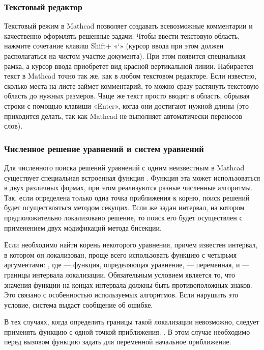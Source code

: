 \subsubsection*{Текстовый редактор}

Текстовый режим в Mathcad позволяет создавать всевозможные комментарии и качественно оформлять решенные задачи.
Чтобы ввести текстовую область, нажмите сочетание клавиш Shift+ «‘» (курсор ввода при этом должен располагаться на чистом участке документа). При этом появится специальная рамка, а курсор ввода приобретет вид красной вертикальной линии.
Набирается текст в Mathcad точно так же, как в любом текстовом редакторе. Если известно, сколько места на листе займет комментарий, то можно сразу растянуть текстовую область до нужных размеров. Чаще же текст просто вводят в область, обрывая строки с помощью клавиши «Enter», когда они достигают нужной длины (это приходится делать, так как Mathcad не выполняет автоматически переносов слов).

\subsubsection*{Численное решение уравнений и систем уравнений}
Для численного поиска решений уравнений с одним неизвестным в Mathcad существует специальная встроенная функция . Функция эта может использоваться в двух различных формах, при этом реализуются разные численные алгоритмы. Так, если определена только одна точка приближения к корню, поиск решений будет осуществляться методом секущих. Если же задан интервал, на котором предположительно локализовано решение, то поиск его будет осуществлен с применением двух модификаций метода бисекции.

Если необходимо найти корень некоторого уравнения, причем известен интервал, в котором он локализован, проще всего использовать функцию  с четырьмя аргументами: , где  --- функция, определяющая уравнение,  --- переменная,  и  --- границы интервала локализации. Обязательным условием является то, что значения функции на концах интервала должны быть противоположных знаков. Это связано с особенностью используемых  алгоритмов. Если нарушить это условие, система выдаст сообщение об ошибке.

В тех случаях, когда определить границы такой локализации невозможно, следует применять функцию  с одной точкой приближения: . В этом случае необходимо перед вызовом функцию  задать для переменной  начальное приближение.

